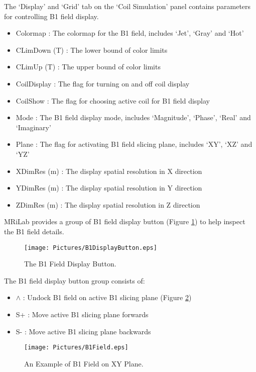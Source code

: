\documentclass{book}%
\begin{document}
\begin{enumerate}
The `Display' and `Grid' tab on the `Coil Simulation' panel contains parameters for controlling B1 field display.

\begin{itemize}
	\item Colormap : The colormap for the B1 field, includes `Jet', `Gray' and `Hot'
	\item CLimDown (T) : The lower bound of color limits
	\item CLimUp (T) : The upper bound of color limits
	\item CoilDisplay : The flag for turning on and off coil display
	\item CoilShow : The flag for choosing active coil for B1 field display
	\item Mode : The B1 field display mode, includes `Magnitude', `Phase', `Real' and `Imaginary'
	\item Plane : The flag for activating B1 field slicing plane, includes `XY', `XZ' and `YZ'
	\item XDimRes (m) : The display spatial resolution in X direction
	\item YDimRes (m) : The display spatial resolution in Y direction
	\item ZDimRes (m) : The display spatial resolution in Z direction
\end{itemize}	

\end{enumerate}

MRiLab provides a group of B1 field display button (Figure \ref{fig:B1DisplayButton}) to help inspect the B1 field details.

\begin{figure}[htbp]
	\centering
		\texttt{[image: Pictures/B1DisplayButton.eps]}
	\caption{The B1 Field Display Button.}
	\label{fig:B1DisplayButton}
\end{figure}

The B1 field display button group consists of:

\begin{itemize}
	\item $\wedge$ : Undock B1 field on active B1 slicing plane (Figure \ref{fig:B1Field})
	\item S+ : Move active B1 slicing plane forwards
	\item S- : Move active B1 slicing plane backwards
\end{itemize}


\begin{figure}[htbp]
	\centering
		\texttt{[image: Pictures/B1Field.eps]}
	\caption{An Example of B1 Field on XY Plane.}
	\label{fig:B1Field}
\end{figure}
\end{document}
